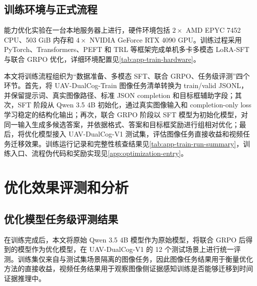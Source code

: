 \subsection{训练环境与正式流程}

能力优化实验在一台本地服务器上进行，硬件环境包括 \(2\times\) AMD EPYC 7452 CPU、503 GiB 内存和 \(4\times\) NVIDIA GeForce RTX 4090 GPU。训练过程采用 PyTorch、Transformers、PEFT 和 TRL 等框架完成单机多卡多模态 LoRA-SFT 与联合 GRPO 优化，详细环境配置见\autoref{tab:app-train-hardware}。

本文将训练流程组织为“数据准备、多模态 SFT、联合 GRPO、任务级评测”四个环节。首先，将 UAV-DualCog-Train 图像任务清单转换为 train/valid JSONL，并保留提示词、真实图像路径、标准 JSON completion 和目标框辅助字段；其次，SFT 阶段从 Qwen 3.5 4B 初始化，通过真实图像输入和 completion-only loss 学习稳定的结构化输出；再次，联合 GRPO 阶段以 SFT 模型为初始化模型，对同一输入生成多候选答案，并依据格式、答案和目标框奖励进行组相对优化；最后，将优化模型接入 UAV-DualCog-V1 测试集，评估图像任务直接收益和视频任务迁移效果。训练运行记录和完整性核查结果见\autoref{tab:app-train-run-summary}，训练入口、流程伪代码和奖励实现见\autoref{app:optimization-entry}。

\FloatBarrier
\section{优化效果评测和分析}

\subsection{优化模型任务级评测结果}

在训练完成后，本文将原始 Qwen 3.5 4B 模型作为原始模型，将联合 GRPO 后得到的模型作为优化模型，在 UAV-DualCog-V1 的 12 个测试场景上进行统一评测。训练集仅来自与测试集场景隔离的图像任务，因此图像任务结果用于衡量优化方法的直接收益，视频任务结果用于观察图像侧证据感知训练是否能够迁移到时间证据推理中。



